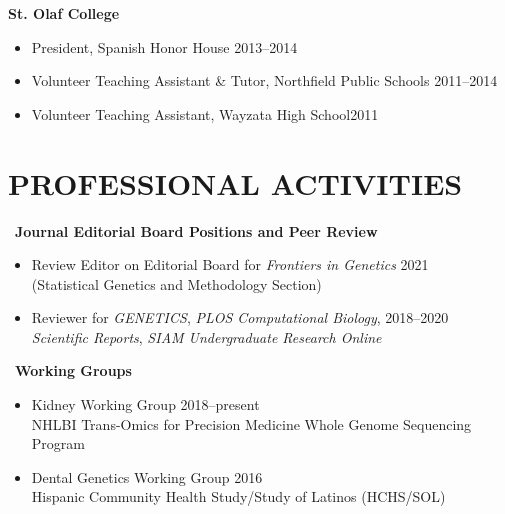 \documentclass[margin]{res}
\begin{document}
\begin{resume}
			\textbf{St. Olaf College}
			\begin{itemize} \itemsep -2pt
			\item President, Spanish Honor House \hfill 2013--2014
			\item Volunteer Teaching Assistant \& Tutor, Northfield Public Schools \hfill 2011--2014
			\item Volunteer Teaching Assistant, Wayzata High School\hfill 2011 \\
			\end{itemize}
						
\section{PROFESSIONAL ACTIVITIES} 
	\ \textbf{Journal Editorial Board Positions and Peer Review} 
	\begin{itemize} \itemsep -2pt 
	\item Review Editor on Editorial Board for \textit{Frontiers in Genetics}  \hfill 2021 \\ (Statistical Genetics and Methodology Section) 
	\item Reviewer for \textit{GENETICS}, \textit{PLOS Computational Biology}, \hfill 2018--2020 \\  \textit{Scientific Reports}, \textit{SIAM Undergraduate Research Online}
	\end{itemize} %
	
	\ \textbf{Working Groups} 
	\begin{itemize} \itemsep -2pt
	\item Kidney Working Group \hfill 2018--present \\ NHLBI Trans-Omics for Precision Medicine Whole Genome Sequencing Program 
	\item Dental Genetics Working Group \hfill 2016 \\ Hispanic Community Health Study/Study of Latinos (HCHS/SOL)
	\end{itemize}
	

\end{resume}
\end{document}
